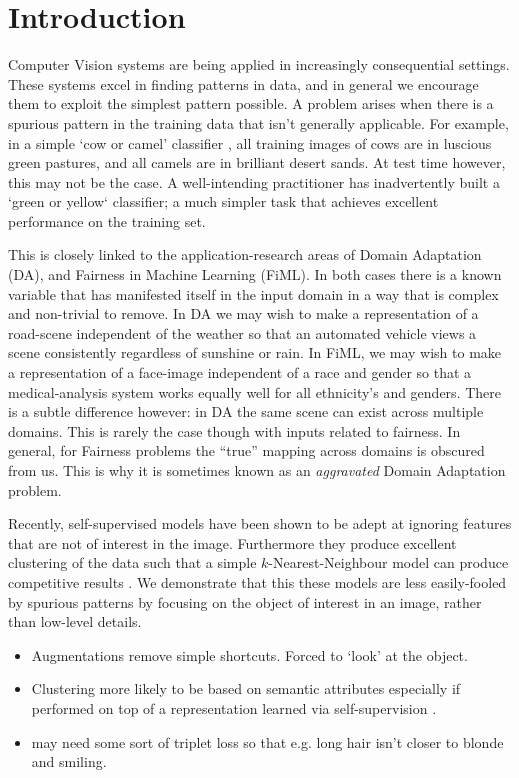 \documentclass{bmvc2k}
\begin{document}
\section{Introduction}
\label{sec:intro}
Computer Vision systems are being applied in increasingly consequential settings.
These systems excel in finding patterns in data, and in general we encourage them to exploit the simplest pattern possible.
A problem arises when there is a spurious pattern in the training data that isn't generally applicable.
For example, in a simple `cow or camel' classifier \citep{beery2018recognition}, all training images of cows are in luscious green pastures, and all camels are in brilliant desert sands.
At test time however, this may not be the case. 
A well-intending practitioner has inadvertently built a `green or yellow` classifier; a much simpler task that achieves excellent performance on the training set.

This is closely linked to the application-research areas of Domain Adaptation (DA), and Fairness in Machine Learning (FiML). 
In both cases there is a known variable that has manifested itself in the input domain in a way that is complex and non-trivial to remove.
In DA we may wish to make a representation of a road-scene independent of the weather so that an automated vehicle views a scene consistently regardless of sunshine or rain.
In FiML, we may wish to make a representation of a face-image independent of a race and gender so that a medical-analysis system works equally well for all ethnicity's and genders.
There is a subtle difference however: in DA the same scene can exist across multiple domains.
This is rarely the case though with inputs related to fairness.
In general, for Fairness problems the ``true'' mapping across domains is obscured from us.
This is why it is sometimes known as an \emph{aggravated} Domain Adaptation problem.

Recently, self-supervised models have been shown to be adept at ignoring features that are not of interest in the image.
Furthermore they produce excellent clustering of the data such that a simple $k$-Nearest-Neighbour model can produce competitive results \citep{caron2021emerging}.
We demonstrate that this these models are less easily-fooled by spurious patterns by focusing on the object of interest in an image, rather than low-level details.

\begin{itemize}
    \item Augmentations remove simple shortcuts. Forced to `look' at the object.
    \item Clustering more likely to be based on semantic attributes especially if performed on top of a representation learned via self-supervision \citep{van2020scan}.
    \item may need some sort of triplet loss so that e.g. long hair isn't closer to blonde and smiling.
\end{itemize}
\end{document}
